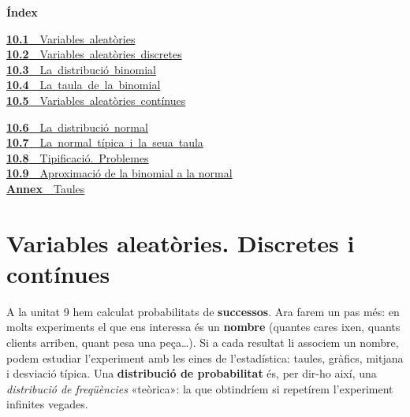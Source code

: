\documentclass[11pt,a4paper]{article}
\begin{document}
\begin{tcolorbox}[colback=fmsurface,colframe=fmsurface,arc=3mm,left=4mm,right=4mm,top=2mm,bottom=2mm]
\small\textbf{Índex}\par\smallskip
\begin{minipage}[t]{0.49\linewidth}\small \mbox{\hyperlink{sec1}{\textbf{\color{fmgreen}10.1}\ \ Variables aleatòries}}\\[3pt]
\mbox{\hyperlink{sec2}{\textbf{\color{fmgreen}10.2}\ \ Variables aleatòries discretes}}\\[3pt]
\mbox{\hyperlink{sec3}{\textbf{\color{fmgreen}10.3}\ \ La distribució binomial}}\\[3pt]
\mbox{\hyperlink{sec4}{\textbf{\color{fmgreen}10.4}\ \ La taula de la binomial}}\\[3pt]
\mbox{\hyperlink{sec5}{\textbf{\color{fmgreen}10.5}\ \ Variables aleatòries contínues}}\\[3pt]\end{minipage}\hfill\begin{minipage}[t]{0.49\linewidth}\small \mbox{\hyperlink{sec6}{\textbf{\color{fmgreen}10.6}\ \ La distribució normal}}\\[3pt]
\mbox{\hyperlink{sec7}{\textbf{\color{fmgreen}10.7}\ \ La normal típica i la seua taula}}\\[3pt]
\mbox{\hyperlink{sec8}{\textbf{\color{fmgreen}10.8}\ \ Tipificació. Problemes}}\\[3pt]
\hyperlink{sec9}{\textbf{\color{fmgreen}10.9}\ \ Aproximació de la binomial a la normal}\\[3pt]\mbox{\hyperlink{annex}{\textbf{\color{fmgreen}Annex}\ \ Taules}}\end{minipage}
\end{tcolorbox}

\section{Variables aleatòries. Discretes i contínues}\hypertarget{sec1}{}

A la unitat 9 hem calculat probabilitats de \textbf{successos}. Ara farem un pas més: en molts experiments el que ens interessa és un \textbf{nombre} (quantes cares ixen, quants clients arriben, quant pesa una peça\dots{}). Si a cada resultat li associem un nombre, podem estudiar l'experiment amb les eines de l'estadística: taules, gràfics, mitjana i desviació típica. Una \textbf{distribució de probabilitat} és, per dir-ho així, una \emph{distribució de freqüències} «teòrica»: la que obtindríem si repetírem l'experiment infinites vegades.
\end{document}
